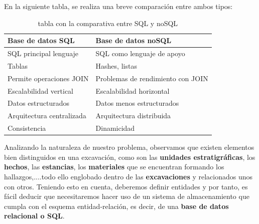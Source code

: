 En la siguiente tabla, se realiza una breve comparación entre ambos tipos: 

    \begin{table}[H]
        \begin{center}
            \begin{tabular}{ |l|l| } \hline
                \textbf{Base de datos SQL} & \textbf{Base de datos noSQL} \\ \hline
                SQL principal lenguaje & SQL como lenguaje de apoyo \\
                Tablas & Hashes, listas \\
                Permite operaciones JOIN & Problemas de rendimiento con JOIN \\
                Escalabilidad vertical & Escalabilidad horizontal \\
                Datos estructurados & Datos menos estructurados \\ 
                Arquitectura centralizada & Arquitectura distribuida \\
                Consistencia & Dinamicidad \\ \hline
            \end{tabular}
            \caption{tabla con la comparativa entre SQL y noSQL}
            \label{tab:databases}
        \end{center}
    \end{table}

Analizando la naturaleza de nuestro problema, observamos que existen elementos bien
distinguidos en una excavación, como son las \textbf{unidades estratigráficas}, los 
\textbf{hechos}, las \textbf{estancias}, los \textbf{materiales} que se encuentran formando
los hallazgos,....todo ello englobado dentro de las \textbf{excavaciones} y relacionados
unos con otros. Teniendo esto en cuenta, deberemos definir entidades y por tanto, es fácil
deducir que necesitaremos hacer uso de un sistema de almacenamiento que cumpla con el esquema
entidad-relación, es decir, de una \textbf{base de datos relacional o SQL}.
